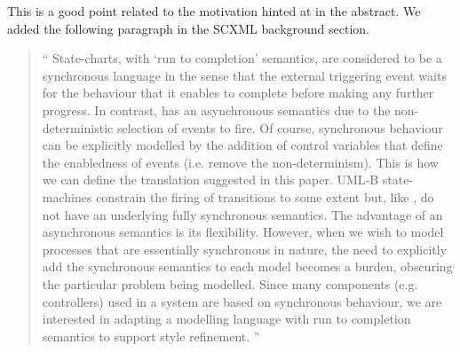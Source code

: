 \documentclass{response}
\begin{document}
\begin{comment}{Reviewer \#1}
    Presentation
    This paper presents an embedding of statecharts in Event-B. As such, it can
    be considered as a shallow embedding of statecharts in Event-B. A strong
    point of the paper is to adress through refinements the derivation of a 
    concrete application. The starting point being the basic semantics of the 
    execution model of statecharts and the last refinement being the considered
    application at a given level of detail. Moreover, the paper goes beyond the 
    usual safety properties usually addressed by such approaches : liveness 
    properties are here considered.
    From my point of view, the presented work is valuable. Actually, it
    can be considered as emerging from the synthesis of three conference papers
    [12,13,14].

  Discussion
    I would appreciate if the authors could elaborate their work along the 
    following points:
    - Semantics. Statecharts have a long history. By now, they can be
    considered as belonging to the family of synchronous languages. It
    would be interesting if the authors could give some comments on the
    choice of statecharts and especially on the relevance of the considered
    semantics of run-to-completion. Otherwise stated could the authors
    highlight the benefits of such a choice in general and of stachecharts
    especially.
\end{comment}

\begin{response}
  This is a good point related to the motivation hinted at in the abstract. We added the following paragraph in the SCXML background section.
  \begin{quote}
    `` 
    State-charts, with `run to completion' semantics, are considered to be a synchronous language in the sense that the external triggering event waits for the behaviour that it enables to complete before making any further progress.
    In contrast, \mbox{\EventB} has an asynchronous semantics due to the non-deterministic selection of events to fire. 
    Of course, synchronous behaviour can be explicitly modelled by the addition of control variables that define the enabledness of events (i.e. remove the non-determinism).
    This is how we can define the translation suggested in this paper.
    UML-B state-machines constrain the firing of transitions to some extent but, like \mbox{\EventB}, do not have an underlying fully synchronous semantics.
    The advantage of an asynchronous semantics is its flexibility.
    However, when we wish to model processes that are essentially synchronous in nature, the need to explicitly add the synchronous semantics to each model becomes a burden, obscuring the particular problem being modelled.
	Since many components (e.g. controllers) used in a system are based on synchronous behaviour, we are interested in adapting a modelling language with run to completion semantics to support \mbox{\EventB} style refinement.
   ''
  \end{quote}
\end{response}
\end{document}
